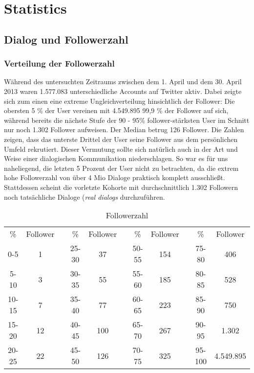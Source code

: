 \documentclass[main.tex]{subfiles}
\begin{document}
\section{Statistics}


\subsection{Dialog und Followerzahl}

\subsubsection{Verteilung der Followerzahl}
Während des untersuchten Zeitraums zwischen dem 1. April und dem 30. April 2013 waren 1.577.083 unterschiedliche Accounts auf Twitter aktiv. Dabei zeigte sich zum einen eine extreme Ungleichverteilung hinsichtlich der Follower: Die obersten 5 \% der User vereinen mit 4.549.895 99,9 \% der Follower auf sich, während bereits die nächste Stufe der 90 - 95\% follower-stärksten User im Schnitt nur noch 1.302 Follower aufweisen. Der Median betrug 126 Follower. Die Zahlen zeigen, dass das unterste Drittel der User seine Follower aus dem persönlichen Umfeld rekrutiert. Dieser Vermutung sollte sich natürlich auch in der Art und Weise einer dialogischen Kommunikation niederschlagen. So war es für uns naheliegend, die letzten 5 Prozent der User nicht zu betrachten, da die extrem hohe Followerzahl von über 4 Mio Dialoge praktisch komplett ausschließt. Stattdessen scheint die vorletzte Kohorte mit durchschnittlich 1.302 Followern noch tatsächliche Dialoge (\textit{real dialogs} durchzuführen.

\begin{table}[h]
\centering
\begin{tabular}{ccccccccccc}
\%    & Follower &  & \%    & Follower &  & \%    & Follower &  & \%     & Follower  \\
0-5   & 1        &  & 25-30 & 37       &  & 50-55 & 154      &  & 75-80  & 406       \\
5-10  & 3        &  & 30-35 & 55       &  & 55-60 & 185      &  & 80-85  & 528       \\
10-15 & 7        &  & 35-40 & 77       &  & 60-65 & 223      &  & 85-90  & 750       \\
15-20 & 12       &  & 40-45 & 100      &  & 65-70 & 267      &  & 90-95  & 1.302     \\
20-25 & 22       &  & 45-50 & 126      &  & 70-75 & 325      &  & 95-100 & 4.549.895
\end{tabular}
\caption{Followerzahl}
\label{my-label}
\end{table}
\end{document}
